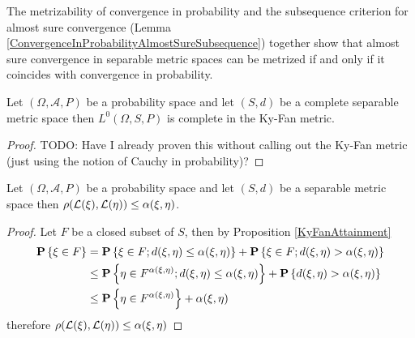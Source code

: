 The metrizability of convergence in probability and the subsequence criterion for almost sure convergence (Lemma \ref{ConvergenceInProbabilityAlmostSureSubsequence}) together show that almost sure convergence in separable metric spaces can be metrized if and only if it coincides with convergence in probability.

\begin{prop}Let $(\Omega, \mathcal{A}, P)$ be a probability space and let $(S,d)$ be a complete separable metric space then $L^0(\Omega, S, P)$ is complete in the Ky-Fan metric.
\end{prop}
\begin{proof}
TODO: Have I already proven this without calling out the Ky-Fan metric (just using the notion of Cauchy in probability)?
\end{proof}

\begin{thm}\label{KyFanProhorov}Let $(\Omega, \mathcal{A}, P)$ be a probability space and let $(S,d)$ be a separable metric space then $\rho(\mathcal{L}(\xi), \mathcal{L}(\eta)) \leq \alpha(\xi, \eta)$.
\end{thm}
\begin{proof}
Let $F$ be a closed subset of $S$, then by Proposition \ref{KyFanAttainment}
\begin{align*}
\textbf{P}\left \{\xi \in F \right \} &= \textbf{P}\left \{\xi \in F; d(\xi, \eta) \leq \alpha(\xi, \eta) \right \} + \textbf{P}\left \{\xi \in F; d(\xi, \eta) > \alpha(\xi, \eta) \right \} \\
&\leq \textbf{P}\left \{\eta \in F^{\alpha(\xi, \eta)}; d(\xi, \eta) \leq \alpha(\xi, \eta) \right \} + \textbf{P}\left \{d(\xi, \eta) > \alpha(\xi, \eta) \right \} \\
&\leq \textbf{P}\left \{\eta \in F^{\alpha(\xi, \eta)} \right \} + \alpha(\xi, \eta) \\
\end{align*}
therefore $\rho(\mathcal{L}(\xi), \mathcal{L}(\eta)) \leq \alpha(\xi, \eta)$
\end{proof}

